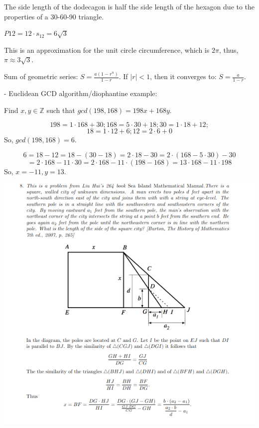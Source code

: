 \documentclass{article}
\newcommand{\ZZ}{\mathbb{Z}}
\begin{document}
The side length of the dodecagon is half the side length of the hexagon due to the properties of a 30-60-90 triangle.

$P{12} = 12 \cdot s_{12} = 6 \sqrt{3}$

This is an approximation for the unit circle circumference, which is $2 \pi$,
thus, $\pi \approx 3 \sqrt{3}$.

Sum of geometric series: $S = \frac{a(1 - r^n)}{1-r}$.
If $|r| < 1$, then it converges to: $S = \frac{a}{1-r}$.

- Euclidean GCD algorithm/diophantine example:

Find $x, y \in \ZZ$ such that $gcd(198, 168) = 198x + 168y$.

\[198 = 1 \cdot 168 + 30; 168 = 5 \cdot 30 + 18; 30 = 1 \cdot 18 + 12;\]
\[18 = 1 \cdot 12 + 6; 12 = 2 \cdot 6 + 0\]
So, $gcd(198, 168) = 6$.

\[6 = 18 - 12 = 18 - (30 - 18) = 2 \cdot 18 - 30 = 2 \cdot (168 - 5 \cdot 30) - 30\]
\[= 2 \cdot 168 - 11 \cdot 30 = 2 \cdot 168 - 11 \cdot (198 - 168) = 13 \cdot 168 - 11 \cdot 198\]
So, $x = -11, y = 13$.


\includegraphics[width=150mm]{walled_city}
\end{document}
